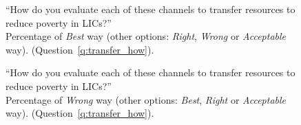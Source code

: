 \begin{figure}[h!]
    \caption[\textit{Best} way to transfer resources to LICs]{``How do you evaluate each of these channels to transfer resources to reduce poverty in LICs?''\\ Percentage of \textit{Best} way (other options: \textit{Right}, \textit{Wrong} or \textit{Acceptable} way). (Question~\ref{q:transfer_how}).
    }\label{fig:transfer_how_above_one}
\end{figure}

\begin{figure}[h!]
    \caption[\textit{Wrong} way to transfer resources to LICs]{``How do you evaluate each of these channels to transfer resources to reduce poverty in LICs?''\\ Percentage of \textit{Wrong} way (other options: \textit{Best}, \textit{Right} or \textit{Acceptable} way). (Question~\ref{q:transfer_how}).
    }\label{fig:transfer_how_negative}
\end{figure}

